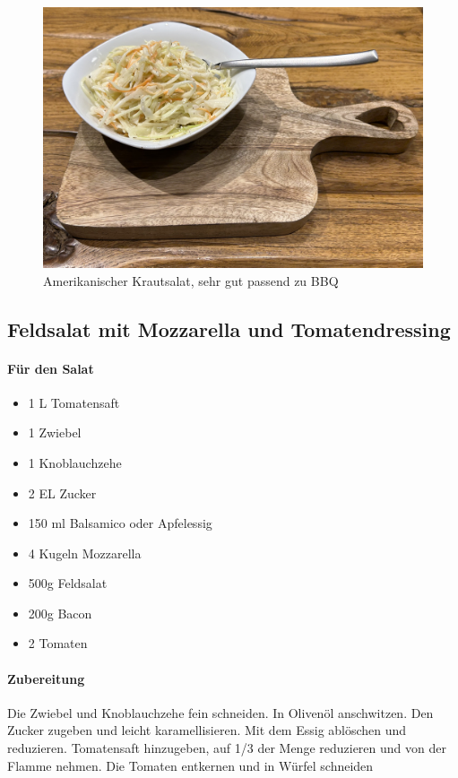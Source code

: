 \begin{figure}[htbp]
	\centering
	\includegraphics[scale=.4]{pics/Coleslaw}
	\caption{Amerikanischer Krautsalat, sehr gut passend zu BBQ}
	\label{fig:Coleslaw}
\end{figure}

\subsection{Feldsalat mit Mozzarella und Tomatendressing}

\paragraph{Für den Salat}

\begin{itemize}[noitemsep]
	\item 1 L Tomatensaft
	\item 1 Zwiebel
	\item 1 Knoblauchzehe
	\item 2 EL Zucker
	\item 150 ml Balsamico oder Apfelessig
	\item 4 Kugeln Mozzarella
	\item 500g Feldsalat
	\item 200g Bacon
	\item 2 Tomaten
\end{itemize}

\paragraph{Zubereitung}

Die Zwiebel und  Knoblauchzehe fein schneiden. In Olivenöl anschwitzen.
Den Zucker zugeben und leicht karamellisieren. Mit dem Essig ablöschen und 
reduzieren.
Tomatensaft hinzugeben,  auf 1/3 der Menge reduzieren und von der Flamme 
nehmen. 
Die Tomaten entkernen und in Würfel schneiden

